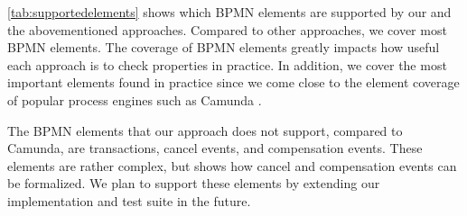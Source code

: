 \documentclass{lmcs} %
\begin{document}
\autoref{tab:supportedelements} shows which BPMN elements are supported by our and the abovementioned approaches.
Compared to other approaches, we cover most BPMN elements.
The coverage of BPMN elements greatly impacts how useful each approach is to check properties in practice.
In addition, we cover the most important elements found in practice since we come close to the element coverage of popular process engines such as Camunda \cite{camundaservicesgmbhBPMNImplementationReference2023}.

The BPMN elements that our approach does not support, compared to Camunda, are transactions, cancel events, and compensation events.
These elements are rather complex, but \cite{vangorpVisualTokenbasedFormalization2013} shows how cancel and compensation events can be formalized.
We plan to support these elements by extending our implementation and test suite in the future.
\end{document}
